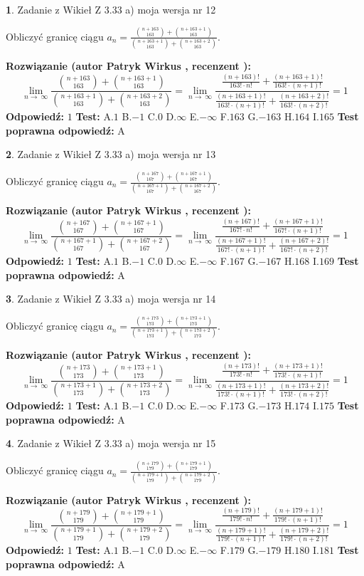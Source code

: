 \documentclass[12pt, a4paper]{article}
\theoremstyle{definition} %
\newtheorem{zad}{}
\newcommand{\zadStart}[1]{\begin{zad}#1\newline}
\newcommand{\zadStop}{\end{zad}}
\newcommand{\rozwStart}[2]{\noindent \textbf{Rozwiązanie (autor #1 , recenzent #2): }\newline}
\newcommand{\rozwStop}{\newline}
\newcommand{\odpStart}{\noindent \textbf{Odpowiedź:}\newline}
\newcommand{\odpStop}{\newline}
\newcommand{\testStart}{\noindent \textbf{Test:}\newline}
\newcommand{\testStop}{\newline}
\newcommand{\kluczStart}{\noindent \textbf{Test poprawna odpowiedź:}\newline}
\newcommand{\kluczStop}{\newline}
\begin{document}
\zadStart{Zadanie z Wikieł Z 3.33 a) moja wersja nr 12}

Obliczyć granicę ciągu $a_{n}=\frac{{n+163\choose163}+{n+163+1\choose163}}{{n+163+1\choose163}+{n+163+2\choose163}}$.
\zadStop
\rozwStart{Patryk Wirkus}{}
$$\lim\limits_{n\to\ \infty}\frac{{n+163\choose163}+{n+163+1\choose163}}{{n+163+1\choose163}+{n+163+2\choose163}} = \lim\limits_{n\to\ \infty}\frac{\frac{(n+163)!}{163! \cdot n!}+\frac{(n+163+1)!}{163! \cdot (n+1)!}}{\frac{(n+163+1)!}{163! \cdot (n+1)!}+\frac{(n+163+2)!}{163! \cdot (n+2)!}} = 1$$
\rozwStop
\odpStart
$1$
\odpStop
\testStart
A.$1$ B.$-1$ C.$0$ D.$\infty$ E.$-\infty$
F.$163$ G.$-163$
H.$164$
I.$165$
\testStop
\kluczStart
A
\kluczStop



\zadStart{Zadanie z Wikieł Z 3.33 a) moja wersja nr 13}

Obliczyć granicę ciągu $a_{n}=\frac{{n+167\choose167}+{n+167+1\choose167}}{{n+167+1\choose167}+{n+167+2\choose167}}$.
\zadStop
\rozwStart{Patryk Wirkus}{}
$$\lim\limits_{n\to\ \infty}\frac{{n+167\choose167}+{n+167+1\choose167}}{{n+167+1\choose167}+{n+167+2\choose167}} = \lim\limits_{n\to\ \infty}\frac{\frac{(n+167)!}{167! \cdot n!}+\frac{(n+167+1)!}{167! \cdot (n+1)!}}{\frac{(n+167+1)!}{167! \cdot (n+1)!}+\frac{(n+167+2)!}{167! \cdot (n+2)!}} = 1$$
\rozwStop
\odpStart
$1$
\odpStop
\testStart
A.$1$ B.$-1$ C.$0$ D.$\infty$ E.$-\infty$
F.$167$ G.$-167$
H.$168$
I.$169$
\testStop
\kluczStart
A
\kluczStop



\zadStart{Zadanie z Wikieł Z 3.33 a) moja wersja nr 14}

Obliczyć granicę ciągu $a_{n}=\frac{{n+173\choose173}+{n+173+1\choose173}}{{n+173+1\choose173}+{n+173+2\choose173}}$.
\zadStop
\rozwStart{Patryk Wirkus}{}
$$\lim\limits_{n\to\ \infty}\frac{{n+173\choose173}+{n+173+1\choose173}}{{n+173+1\choose173}+{n+173+2\choose173}} = \lim\limits_{n\to\ \infty}\frac{\frac{(n+173)!}{173! \cdot n!}+\frac{(n+173+1)!}{173! \cdot (n+1)!}}{\frac{(n+173+1)!}{173! \cdot (n+1)!}+\frac{(n+173+2)!}{173! \cdot (n+2)!}} = 1$$
\rozwStop
\odpStart
$1$
\odpStop
\testStart
A.$1$ B.$-1$ C.$0$ D.$\infty$ E.$-\infty$
F.$173$ G.$-173$
H.$174$
I.$175$
\testStop
\kluczStart
A
\kluczStop



\zadStart{Zadanie z Wikieł Z 3.33 a) moja wersja nr 15}

Obliczyć granicę ciągu $a_{n}=\frac{{n+179\choose179}+{n+179+1\choose179}}{{n+179+1\choose179}+{n+179+2\choose179}}$.
\zadStop
\rozwStart{Patryk Wirkus}{}
$$\lim\limits_{n\to\ \infty}\frac{{n+179\choose179}+{n+179+1\choose179}}{{n+179+1\choose179}+{n+179+2\choose179}} = \lim\limits_{n\to\ \infty}\frac{\frac{(n+179)!}{179! \cdot n!}+\frac{(n+179+1)!}{179! \cdot (n+1)!}}{\frac{(n+179+1)!}{179! \cdot (n+1)!}+\frac{(n+179+2)!}{179! \cdot (n+2)!}} = 1$$
\rozwStop
\odpStart
$1$
\odpStop
\testStart
A.$1$ B.$-1$ C.$0$ D.$\infty$ E.$-\infty$
F.$179$ G.$-179$
H.$180$
I.$181$
\testStop
\kluczStart
A
\kluczStop
\end{document}
